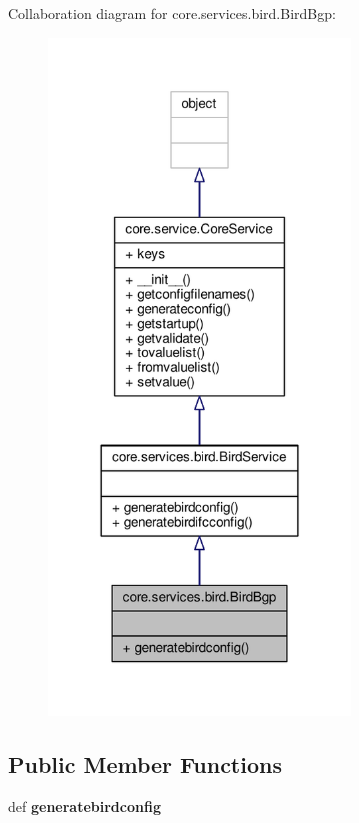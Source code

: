 Collaboration diagram for core.\+services.\+bird.\+Bird\+Bgp\+:
\nopagebreak
\begin{figure}[H]
\begin{center}
\leavevmode
\includegraphics[width=227pt]{classcore_1_1services_1_1bird_1_1_bird_bgp__coll__graph}
\end{center}
\end{figure}
\subsection*{Public Member Functions}
\begin{DoxyCompactItemize}
\item 
\hypertarget{classcore_1_1services_1_1bird_1_1_bird_bgp_ae3c09051f02890eb985557f579d5ac32}{def {\bfseries generatebirdconfig}}\label{classcore_1_1services_1_1bird_1_1_bird_bgp_ae3c09051f02890eb985557f579d5ac32}

\end{DoxyCompactItemize}
